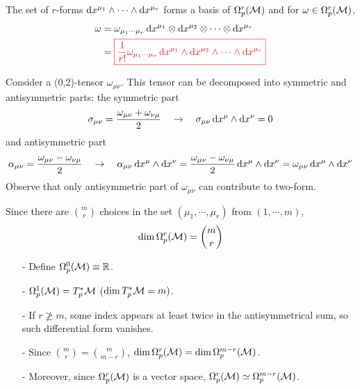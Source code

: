 \documentclass[a4paper, 10pt]{article}
\begin{document}
\seprule

\begin{obs}
    The set of $r$-forms $\mathrm{d}{x}^{\mu_{1}} \wedge \cdots \wedge \mathrm{d}{x}^{\mu_{r}}$ forms a basis of $\Omega_{p}^{r}(\mathcal{M})$ and for $\omega \in \Omega_{p}^{r}(\mathcal{M})$,
    \begin{align*}
        \omega &= \omega_{\mu_{1}\cdots\mu_{r}}\,\mathrm{d}{x}^{\mu_{1}}\otimes\mathrm{d}{x}^{\mu_{2}}\otimes\cdots\otimes\mathrm{d}{x}^{\mu_{r}} \\
        &= \textcolor{red}{\boxed{\frac{1}{r!}\omega_{\mu_{1}\cdots\mu_{r}}\,\mathrm{d}{x}^{\mu_{1}}\wedge\mathrm{d}{x}^{\mu_{2}}\wedge\cdots\wedge\mathrm{d}{x}^{\mu_{r}}}}
    \end{align*}
\end{obs}

\begin{obs}
    Consider a (0,2)-tensor $\omega_{\mu\nu}$. This tensor can be decomposed into symmetric and antisymmetric parts: the symmetric part
    \[ \sigma_{\mu\nu} = \frac{\omega_{\mu\nu} + \omega_{\nu\mu}}{2} \quad\rightarrow\quad \sigma_{\mu\nu}\,\mathrm{d}{x}^{\mu}\wedge\mathrm{d}{x}^{\nu} = 0 \]
    and antisymmetric part
    \[ \alpha_{\mu\nu} = \frac{\omega_{\mu\nu} - \omega_{\nu\mu}}{2} \quad\rightarrow\quad \alpha_{\mu\nu}\,\mathrm{d}{x}^{\mu}\wedge\mathrm{d}{x}^{\nu} = \frac{\omega_{\mu\nu} - \omega_{\nu\mu}}{2}\,\mathrm{d}{x}^{\mu}\wedge\mathrm{d}{x}^{\nu} = \omega_{\mu\nu}\,\mathrm{d}{x}^{\mu}\wedge\mathrm{d}{x}^{\nu} \]
    Observe that only antisymmetric part of $\omega_{\mu\nu}$ can contribute to two-form.
\end{obs}
\newpage


\begin{obs}
    Since there are $\binom{m}{r}$ choices in the set $(\mu_{1},\cdots,\mu_{r})$ from $(1,\cdots,m)$,
    \[ \dim\Omega_{p}^{r}(\mathcal{M}) = \binom{m}{r} \]
    \begin{itemize}
        \item[-] Define $\Omega_{p}^{0}(\mathcal{M}) \equiv \mathbb{R}$.
        \item[-] $\Omega_{p}^{1}(\mathcal{M}) = T_{p}^{\ast}\mathcal{M}$ ($\dim T_{p}^{\ast}\mathcal{M} = m)$.
        \item[-] If $r \ngeq m$, some index appears at least twice in the antisymmetrical sum, so such differential form vanishes.
        \item[-] Since $\binom{m}{r} = \binom{m}{m-r}$, $\dim\Omega_{p}^{r}(\mathcal{M}) = \dim\Omega_{p}^{m-r}(\mathcal{M})$.
        \item[-] Moreover, since $\Omega_{p}^{r}(\mathcal{M})$ is a vector space, $\Omega_{p}^{r}(\mathcal{M}) \simeq \Omega_{p}^{m-r}(\mathcal{M})$.
    \end{itemize}
\end{obs}
\end{document}

